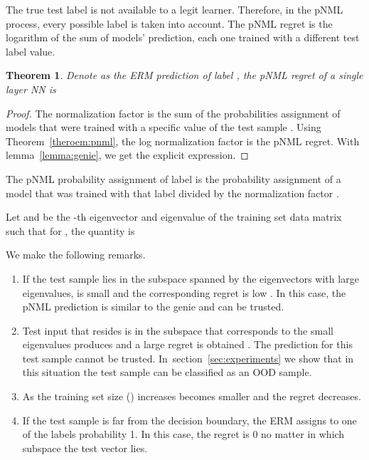 \documentclass{article}
\def\Theoref#1{Theorem~\ref{#1}}
\def\lemmaref#1{lemma~\ref{#1}}
\def\secref#1{section~\ref{#1}}
\newtheorem{theorem}{Theorem}
\begin{document}
The true test label is not available to a legit learner. Therefore, in the pNML process, every possible label is taken into account. The pNML regret is the logarithm of the sum of models' prediction, each one trained with a different test label value.




\begin{theorem}
Denote  as the ERM prediction of label , the pNML regret of a single layer NN is

\end{theorem}
\begin{proof}
The normalization factor is the sum of the probabilities assignment of models that were trained with a specific value of the test sample
.
Using \Theoref{theroem:pnml}, the log normalization factor is the pNML regret. 
With \lemmaref{lemma:genie}, we get the explicit expression.
\end{proof}

The pNML probability assignment of label  is the probability assignment of a model that was trained with that label divided by the normalization factor  .

Let  and  be the -th eigenvector and eigenvalue of the training set data matrix  such that for , the quantity  is

We make the following remarks.
\begin{enumerate}
\item 
If the test sample  lies in the subspace spanned by the eigenvectors with large eigenvalues,  is small and the corresponding regret is low
.
In this case, the pNML prediction is similar to the genie and can be trusted.
\item
Test input that resides is in the subspace that corresponds to the small eigenvalues produces  and a large regret is obtained 
.
The prediction for this test sample cannot be trusted. In~\secref{sec:experiments} we show that in this situation the test sample can be classified as an OOD sample.
\item
As the training set size () increases  becomes smaller and the regret decreases.
\item If the test sample is far from the decision boundary, the ERM assigns to one of the labels probability 1. In this case, the regret is 0 no matter in which subspace the test vector lies.
\end{enumerate}
\end{document}
